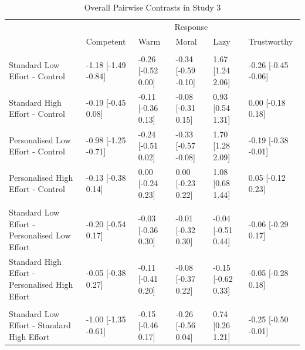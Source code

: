 \documentclass[
  man,
  floatsintext,
  longtable,
  nolmodern,
  notxfonts,
  notimes,
  colorlinks=true,linkcolor=blue,citecolor=blue,urlcolor=blue]{apa7}
\begin{document}
\begin{table}

{\caption{{Overall Pairwise Contrasts in Study 3
\vspace{20pt}}{\label{tbl-treatment-diffs-study3}}}
\vspace{-20pt}}

\begingroup\fontsize{7}{9}\selectfont

\begin{tabular}{llllll}
\toprule
\multicolumn{1}{c}{ } & \multicolumn{5}{c}{Response} \\
\cmidrule(l{3pt}r{3pt}){2-6}
  & Competent & Warm & Moral & Lazy & Trustworthy\\
\midrule
\addlinespace[0.3em]
\multicolumn{6}{l}{\textbf{Comparison to control}}\\
\hspace{1em}Standard Low Effort - Control & -1.18 [-1.49 -0.84] & -0.26 [-0.52 0.00] & -0.34 [-0.59 -0.10] & 1.67 [1.24 2.06] & -0.26 [-0.45 -0.06]\\
\hspace{1em}Standard High Effort - Control & -0.19 [-0.45 0.08] & -0.11 [-0.36 0.13] & -0.08 [-0.31 0.15] & 0.93 [0.54 1.31] & 0.00 [-0.18 0.18]\\
\hspace{1em}Personalised Low Effort - Control & -0.98 [-1.25 -0.71] & -0.24 [-0.51 0.02] & -0.33 [-0.57 -0.08] & 1.70 [1.28 2.09] & -0.19 [-0.38 -0.01]\\
\hspace{1em}Personalised High Effort - Control & -0.13 [-0.38 0.14] & 0.00 [-0.24 0.23] & 0.00 [-0.23 0.22] & 1.08 [0.68 1.44] & 0.05 [-0.12 0.23]\\
\addlinespace[0.3em]
\multicolumn{6}{l}{\textbf{Effect of AI type}}\\
\hspace{1em}Standard Low Effort - Personalised Low Effort & -0.20 [-0.54 0.17] & -0.03 [-0.36 0.30] & -0.01 [-0.32 0.30] & -0.04 [-0.51 0.44] & -0.06 [-0.29 0.17]\\
\hspace{1em}Standard High Effort - Personalised High Effort & -0.05 [-0.38 0.27] & -0.11 [-0.41 0.20] & -0.08 [-0.37 0.22] & -0.15 [-0.62 0.33] & -0.05 [-0.28 0.18]\\
\addlinespace[0.3em]
\multicolumn{6}{l}{\textbf{Effect of effort}}\\
\hspace{1em}Standard Low Effort - Standard High Effort & -1.00 [-1.35 -0.61] & -0.15 [-0.46 0.17] & -0.26 [-0.56 0.04] & 0.74 [0.26 1.21] & -0.25 [-0.50 -0.01]\\

\end{tabular}
\end{table}
\end{document}
